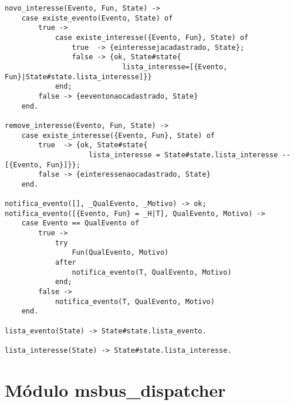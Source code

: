 \begin{lstlisting}
novo_interesse(Evento, Fun, State) ->
	case existe_evento(Evento, State) of
		true -> 
			case existe_interesse({Evento, Fun}, State) of
				true  -> {einteressejacadastrado, State};
				false -> {ok, State#state{
							lista_interesse=[{Evento, Fun}|State#state.lista_interesse]}}
			end;
		false -> {eeventonaocadastrado, State}
	end.

remove_interesse(Evento, Fun, State) ->
	case existe_interesse({Evento, Fun}, State) of
		true  -> {ok, State#state{
					lista_interesse = State#state.lista_interesse -- [{Evento, Fun}]}};
		false -> {einteressenaocadastrado, State}
	end.
		
notifica_evento([], _QualEvento, _Motivo) -> ok;
notifica_evento([{Evento, Fun} = _H|T], QualEvento, Motivo) ->
	case Evento == QualEvento of
		true ->
			try
				Fun(QualEvento, Motivo)
			after
				notifica_evento(T, QualEvento, Motivo)		
			end;
		false ->
			notifica_evento(T, QualEvento, Motivo)
	end.
	
lista_evento(State) -> State#state.lista_evento.	

lista_interesse(State) -> State#state.lista_interesse.	

\end{lstlisting}


\section{Módulo msbus_dispatcher}

